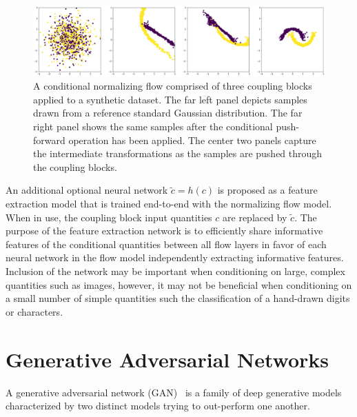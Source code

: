 \begin{figure}[htbp]
    \caption[Conditional normalizing flow density estimation on synthetic data]{
        A conditional normalizing flow comprised of three coupling blocks applied to a synthetic dataset.
        The far left panel depicts samples drawn from a reference standard Gaussian distribution.
        The far right panel shows the same samples after the conditional push-forward operation has been applied.
        The center two panels capture the intermediate transformations as the samples are pushed through the coupling blocks.
    }
    \begin{center}
        \setlength{\fboxsep}{0pt}%
        \setlength{\fboxrule}{1pt}%
        \includegraphics[width=150mm]{figs/two_moons_flow}
    \end{center}
    \label{fig:moon_flows}
\end{figure}

An additional optional neural network $\tilde{c} = h(c)$ is proposed as a feature extraction model that is trained
end-to-end with the normalizing flow model.
When in use, the coupling block input quantities $c$ are replaced by $\tilde{c}$.
The purpose of the feature extraction network is to efficiently share informative features of the
conditional quantities between all flow layers in favor of each neural network in the flow model independently
extracting informative features.
Inclusion of the network may be important when conditioning on large, complex quantities such as images, however, it
may not be beneficial when conditioning on a small number of simple quantities such the classification of a hand-drawn
digits or characters.

\section{Generative Adversarial Networks}\label{sec:generative-adversarial-networks}

A generative adversarial network (GAN)~\cite{gan_goodfellow} is a family of deep generative models characterized by two
distinct models trying to out-perform one another.

